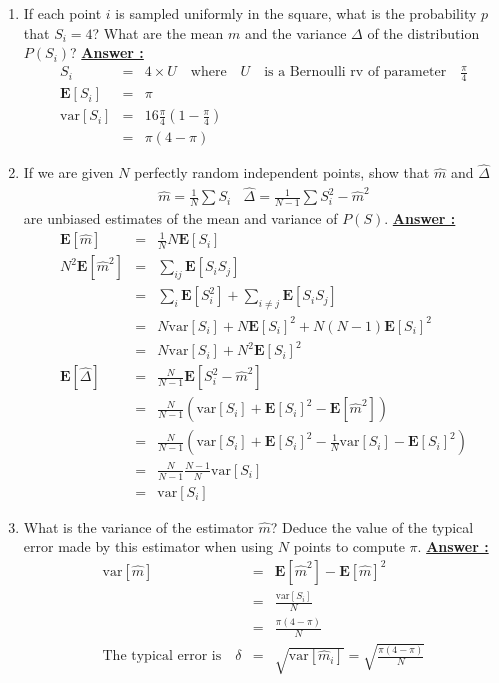 \documentclass[11pt]{article}
\newcommand{\E}[1]{\mathbf{E}\left[#1\right] }
\begin{document}
\begin{enumerate}
\item If each point $i$ is sampled uniformly in the square, what is the probability $p$ that $S_i=4$?
What are the mean $m$ and the variance $\Delta$ of the distribution $P(S_i)$?
\newline
\textbf{\underline{Answer :}}
\begin{eqnarray*}
S_i &= &4 \times U \quad \mbox{where} \quad U \quad \mbox{is a Bernoulli rv of parameter} \quad \frac{\pi}{4} \\
\E{S_i} &= &\pi\\
\mathrm{var}[S_i] &= &16\frac{\pi}{4}(1- \frac{\pi}{4}) \\
&= &\pi(4-\pi)
\end{eqnarray*}


\item If we are given $N$ perfectly random independent points, show that $\hat m$ and $\hat \Delta$ 
\begin{eqnarray}
\hat m = \frac 1N \sum S_i ~~~~
\hat \Delta = \frac 1{N-1} \sum S^2_i - {\hat m}^2 \nonumber
\end{eqnarray}
are unbiased estimates of the mean and variance of $P(S)$.
\newline
\textbf{\underline{Answer :}}
\begin{eqnarray*}
	\E{\hat m} &= &\frac{1}{N} N \E{S_i} \\
    N^2 \E{\hat m^2} &= &\sum_{ij} \E{S_i S_j} \\
    &= & \sum_{i} \E{S_i^2} + \sum_{i \neq j} \E{S_i S_j} \\
    &= &N \mbox{var}[S_i] + N\E{S_i}^2 + N(N-1)\E{S_i}^2 \\
    &= &N \mbox{var}[S_i] + N^2\E{S_i}^2 \\
    \E{\hat \Delta} &= &\frac{N}{N-1} \E{S_i^2 - \hat m^2} \\
    &= &\frac{N}{N-1} \left( \mbox{var}[S_i] + \E{S_i}^2 - \E{\hat m^2} \right) \\
    &= &\frac{N}{N-1} \left( \mbox{var}[S_i] + \E{S_i}^2 - \frac{1}{N}\mbox{var}[S_i] - \E{S_i}^2 \right) \\
    &= &\frac{N}{N-1} \frac{N-1}{N} \mbox{var}[S_i] \\
    &= &\mbox{var}[S_i]
\end{eqnarray*}


\item What is the variance of the estimator 
$\hat m$? Deduce the value of the typical error made by this estimator when using $N$ points to compute $\pi$.
\newline
\textbf{\underline{Answer :}}
\begin{eqnarray*}
	\mbox{var}[\hat m] &= &\E{\hat m^2} - \E{\hat m}^2 \\
    &= &\frac{\mbox{var}[S_i]}{N} \\
    &= &\frac{\pi(4 - \pi)}{N} \\
    \mbox{The typical error is} \quad \delta &= &\sqrt{\mbox{var}[\hat m_i]} = \sqrt{\frac{\pi(4 - \pi)}{N}}
\end{eqnarray*}



\end{enumerate}
\end{document}
